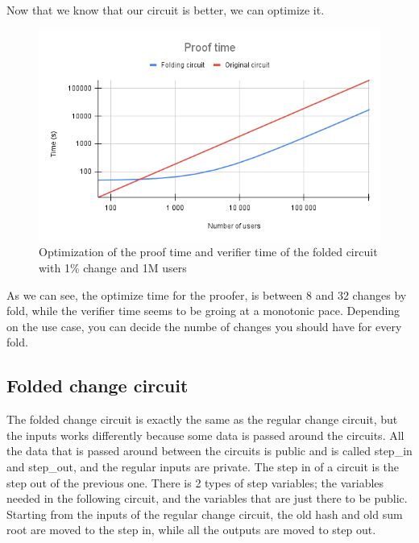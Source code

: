 Now that we know that our circuit is better, we can optimize it.

\begin{figure}[H]
   \centering
   \includegraphics[width=130mm]{Proof time.png}
   \caption{Optimization of the proof time and verifier time of the folded circuit with 1\% change and 1M users}
   \label{overflow}
   \end{figure}

As we can see, the optimize time for the proofer, is between 8 and 32 changes by fold, while the verifier time seems to be groing at a monotonic pace.
Depending on the use case, you can decide the numbe of changes you should have for every fold. 

\subsection{Folded change circuit}
The folded change circuit is exactly the same as the regular change circuit, but the inputs works differently because some data is passed around the circuits.
All the data that is passed around between the circuits is public and is called step_in and step_out, and the regular inputs are private.
The step in of a circuit is the step out of the previous one. There is 2 types of step variables; the variables needed in the following circuit,
and the variables that are just there to be public. 
Starting from the inputs of the regular change circuit, the old hash and old sum root are moved to the step in, while all the outputs are moved to step out.

